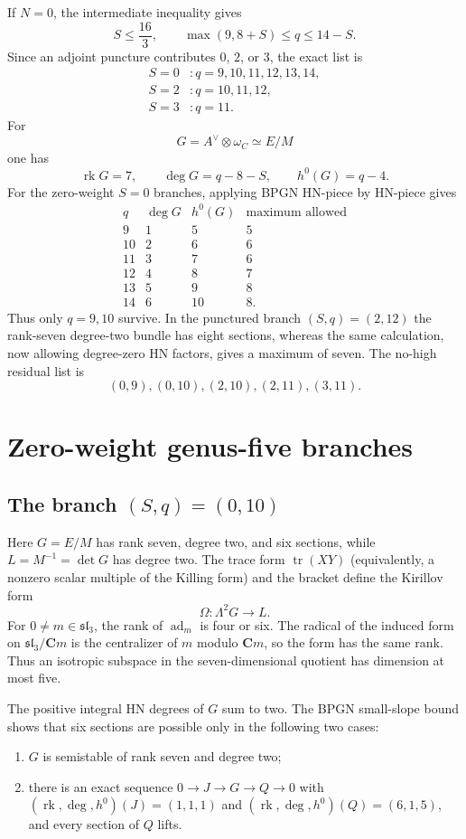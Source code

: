 \documentclass[11pt]{article}
\theoremstyle{definition}
\newcommand{\C}{\mathbf C}
\newcommand{\rk}{\operatorname{rk}}
\newcommand{\ad}{\operatorname{ad}}
\begin{document}
If $N=0$, the intermediate inequality gives
\[
 S\le\frac{16}{3},
 \qquad
 \max(9,8+S)\le q\le14-S.
\]
Since an adjoint puncture contributes $0$, $2$, or $3$, the exact list is
\[
\begin{aligned}
S=0 &: q=9,10,11,12,13,14,\\
S=2 &: q=10,11,12,\\
S=3 &: q=11.
\end{aligned}
\]
For
\[
 G=A^\vee\otimes\omega_C\simeq E/M
\]
one has
\[
 \rk G=7,
 \qquad
 \deg G=q-8-S,
 \qquad
 h^0(G)=q-4.
\]
For the zero-weight $S=0$ branches, applying BPGN HN-piece by HN-piece gives
\[
\begin{array}{c|c|c|c}
q&\deg G&h^0(G)&\text{maximum allowed}\\ \hline
9&1&5&5\\
10&2&6&6\\
11&3&7&6\\
12&4&8&7\\
13&5&9&8\\
14&6&10&8.
\end{array}
\]
Thus only $q=9,10$ survive.  In the punctured branch $(S,q)=(2,12)$ the
rank-seven degree-two bundle has eight sections, whereas the same calculation,
now allowing degree-zero HN factors, gives a maximum of seven.  The no-high
residual list is
\[
 (0,9),(0,10),(2,10),(2,11),(3,11).
\]

\section{Zero-weight genus-five branches}\label{sec:zero-weight5}

\subsection{The branch \texorpdfstring{$(S,q)=(0,10)$}{(S,q)=(0,10)}}

Here $G=E/M$ has rank seven, degree two, and six sections, while
$L=M^{-1}=\det G$ has degree two.  The trace form $\operatorname{tr}(XY)$ (equivalently, a nonzero scalar
multiple of the Killing form) and the bracket define the Kirillov form
\[
 \Omega:\Lambda^2G\longrightarrow L.
\]
For $0\ne m\in\mathfrak{sl}_3$, the rank of $\ad_m$ is four or six.  The
radical of the induced form on $\mathfrak{sl}_3/\C m$ is the centralizer of
$m$ modulo $\C m$, so the form has the same rank.  Thus an isotropic subspace
in the seven-dimensional quotient has dimension at most five.

The positive integral HN degrees of $G$ sum to two.  The BPGN small-slope
bound shows that six sections are possible only in the following two cases:
\begin{enumerate}[label=\textup{(\roman*)}]
\item $G$ is semistable of rank seven and degree two;
\item there is an exact sequence $0\to J\to G\to Q\to0$ with
$(\rk,\deg,h^0)(J)=(1,1,1)$ and $(\rk,\deg,h^0)(Q)=(6,1,5)$, and every
section of $Q$ lifts.
\end{enumerate}
\end{document}
